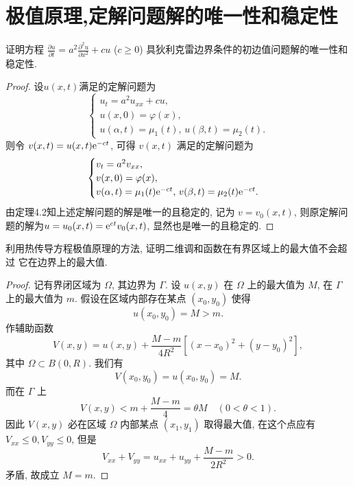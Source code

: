 \section{极值原理,定解问题解的唯一性和稳定性}

\begin{exercise}
  证明方程 $\frac{\partial u}{\partial t} = a^2 \frac{\partial^2 u}{\partial x^2} + cu$
  ($c\geq 0$) 具狄利克雷边界条件的初边值问题解的唯一性和稳定性.
\end{exercise}

\begin{proof}
  设$u(x,t)$满足的定解问题为
  \[\begin{cases}
    u_t = a^2 u_{xx} + cu, \\
    u(x,0) = \varphi(x), \\
    u(\alpha,t) = \mu_1(t),\,u(\beta,t)=\mu_2(t).
  \end{cases}\]
  则令 $v(x,t)=u(x,t) \mathrm{e}^{-ct}$, 可得 $v(x,t)$ 满足的定解问题为
  \[\begin{cases}
    v_t = a^2v_{xx}, \\
    v(x,0) = \varphi(x), \\
    v(\alpha,t) = \mu_1(t)\mathrm{e}^{-ct},\,v(\beta,t) = \mu_2(t)\mathrm{e}^{-ct}.
  \end{cases}\]
  由定理4.2知上述定解问题的解是唯一的且稳定的,
  记为 $v=v_0(x,t)$, 则原定解问题的解为$u = u_0(x,t) = \mathrm{e}^{ct}v_0(x,t)$, 显然也是唯一的且稳定的.
\end{proof}


\begin{exercise}
  利用热传导方程极值原理的方法, 证明二维调和函数在有界区域上的最大值不会超过
  它在边界上的最大值.
\end{exercise}

\begin{proof}
  记有界闭区域为 $\Omega$, 其边界为 $\Gamma$.
  设 $u(x,y)$ 在 $\Omega$ 上的最大值为 $M$, 在 $\Gamma$ 上的最大值为 $m$.
  假设在区域内部存在某点 $(x_0,y_0)$ 使得
  \[u(x_0,y_0) = M > m.\]
  作辅助函数
  \[V(x,y) = u(x,y)+\frac{M-m}{4R^2}\left[(x-x_0)^2+(y-y_0)^2\right],\]
  其中 $\Omega\subset B(0,R)$. 我们有
  \[V(x_0,y_0)=u(x_0,y_0)=M.\]
  而在 $\Gamma$ 上
  \[V(x,y) < m+\frac{M-m}{4}=\theta M\quad (0<\theta<1).\]
  因此 $V(x,y)$ 必在区域 $\Omega$ 内部某点 $(x_1,y_1)$ 取得最大值,
  在这个点应有 $V_{xx}\leq0,V_{yy}\leq 0$, 但是
  \[V_{xx}+V_{yy}=u_{xx}+u_{yy}+\frac{M-m}{2R^2}>0.\]
  矛盾, 故成立 $M=m$.
\end{proof}


